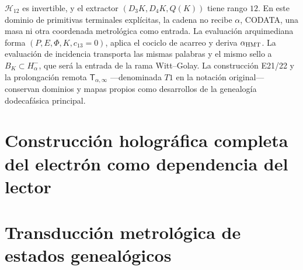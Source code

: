 \(\mathcal H_{12}\) es invertible, y el extractor
\((D_3K,D_4K,Q(K))\) tiene rango \(12\). En este dominio de primitivas
terminales explícitas, la cadena no recibe \(\alpha\), CODATA, una masa ni
otra coordenada metrológica como entrada.
La evaluación arquimediana forma \((P,E,\Phi,K,c_{13}=0)\), aplica el cociclo
de acarreo y deriva \(\alpha_{\rm HMT}\). La evaluación de incidencia
transporta las mismas palabras y el mismo sello a
\(B_K\subset H_\alpha^-\), que será la entrada de la rama Witt--Golay. La
construcción E21/22 y la prolongación remota
\(\mathsf T_{\alpha,\infty}\) ---denominada \(T1\) en la notación
original--- conservan dominios y mapas propios como desarrollos de la
genealogía dodecafásica principal.

\HMTDemoteHeadings
{}
\HMTRestoreHeadings


\begingroup
\def\HMTInternalTraceability{1}
\endgroup


\chapter*{Construcción holográfica completa del electrón como dependencia del lector}

\chapter*{Transducción metrológica de estados genealógicos}
